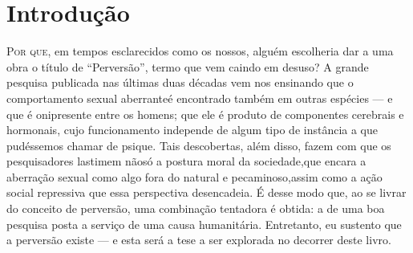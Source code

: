 \begin{comment}
Robert J. Stoller, M.D., é psicanalista e Professor de Psiquiatria
na Universidade da Califórnia na Los Angeles School of Medicine, onde
leciona para estudantes de medicina e alunos residentes da Psiquiatria.
É membro da American Psychoanalytic Association e recebeu seu
treinamento no Los Angeles Psychoanalitic Institute. Stoller é autor de
vários trabalhos focados no desenvolvimento da identidade de gênero
(masculino-feminino). Tem três publicações anteriores sobre o assunto:
\textit{Sex and Gender: On the Development of Masculinity} \textit{and
Femininity} (1968), \textit{Splitting} (1973) e \textit{Sex and Gender
Volume II: The Transsexual} \textit{Experiment} (1975). Adicionalmente
às pesquisas concentradas na identidade de gênero, Stoller tem
demonstrado um inesgotável interesse no campo da pesquisa na área médica.
\end{comment}


\chapter{Introdução}

\textsc{Por que,} em tempos esclarecidos como os nossos, alguém escolheria dar
a uma obra o título de ``Perversão'', termo
que vem caindo em desuso? A grande pesquisa publicada nas últimas
duas décadas vem nos ensinando que o comportamento sexual aberrante\idxaberr[|(] é
encontrado também em outras espécies --- e que é onipresente entre os
homens; que ele é produto de componentes cerebrais e hormonais, cujo
funcionamento independe de algum tipo de instância a que pudéssemos
chamar de psique. Tais descobertas, além disso, fazem com que os
pesquisadores lastimem não\idxaspec[|(] só a postura\idxpervrespo{} moral\idxrespo{} da sociedade,\idxpervaspec[|(] que encara
a aberração sexual como algo fora do natural e pecaminoso,\idxpecad[|(] assim como a
ação social repressiva que essa perspectiva desencadeia. É desse modo
que, ao se livrar do conceito de perversão, uma combinação tentadora é
obtida: a de uma boa pesquisa posta a serviço de uma causa humanitária.
Entretanto, eu sustento que a perversão existe --- e esta será a tese
a ser explorada no decorrer deste livro.


